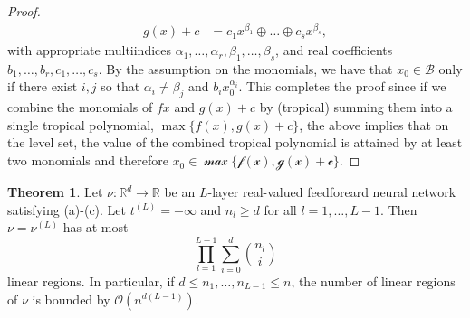 \documentclass{article}
\theoremstyle{definition}
\newtheorem{theorem}{Theorem}[section]
\begin{document}
\begin{proof}
\begin{align*}
g(x) + c &= c_1 x^{\beta_1} \oplus \dots \oplus c_s x^{\beta_s},
\end{align*}
with appropriate multiindices $\alpha_1 , \dots , \alpha_r, \beta_1 , \dots , \beta_s$, and real coefficients $b_1, \dots , b_r, c_1, \dots , c_s$. By the assumption on
the monomials, we have that $x_0 \in \mathcal{B} $ only if there exist $i, j$ so that $\alpha_i \neq \beta_j$ and $b_i x_0^{\alpha_i}$. This completes the proof since if we combine the monomials of $f{x}$ and $g(x) + c$ by (tropical) summing them into a single tropical polynomial, $\max \{f(x), g(x) + c\}$, the above implies that on the level set, the value of the combined tropical polynomial is attained by at least two monomials and therefore $x_0 \in \mathcal{\max\{f(x), g(x) + c\}}$.
\end{proof}

\begin{theorem}
Let $\nu : \mathbb{R}^{d} \to \mathbb{R}$ be an $L$-layer real-valued feedforeard neural network satisfying (a)-(c). Let $t^{(L)}=-\infty$ and $n_{l} \geq d$ for all $l=1, \dots , L-1$. Then $\nu = \nu^{(L)}$ has at most
$$\displaystyle\prod^{L-1}_{l=1}\displaystyle\sum^{d}_{i=0}\binom{n_l}{i}$$
linear regions. In particular, if $d \leq n_1, \dots , n_{L-1} \leq n$, the number of linear regions of $\nu$ is bounded by $\mathcal{O}(n^{d(L-1)})$.
\end{theorem}

\newpage

%
%
%
%
%
%
%
%
%
%
%


%

%
%



\end{document}
